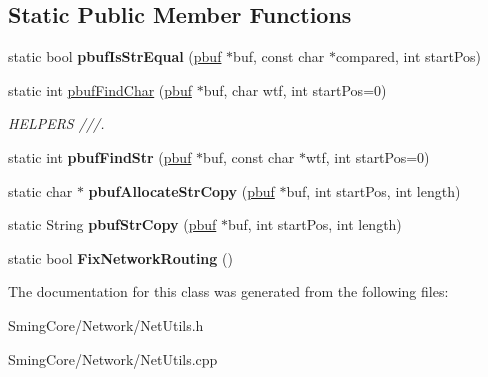 \subsection*{Static Public Member Functions}
\begin{DoxyCompactItemize}
\item 
\hypertarget{class_net_utils_a8d5f716027c7f9fe588058a5f7382c18}{}static bool {\bfseries pbuf\+Is\+Str\+Equal} (\hyperlink{structpbuf}{pbuf} $\ast$buf, const char $\ast$compared, int start\+Pos)\label{class_net_utils_a8d5f716027c7f9fe588058a5f7382c18}

\item 
\hypertarget{class_net_utils_a0b0353dfd9aeae9b1f16275db7699168}{}static int \hyperlink{class_net_utils_a0b0353dfd9aeae9b1f16275db7699168}{pbuf\+Find\+Char} (\hyperlink{structpbuf}{pbuf} $\ast$buf, char wtf, int start\+Pos=0)\label{class_net_utils_a0b0353dfd9aeae9b1f16275db7699168}

\begin{DoxyCompactList}\small\item\em H\+E\+L\+P\+E\+R\+S ///. \end{DoxyCompactList}\item 
\hypertarget{class_net_utils_a930298645b7773227392c08b6efdac33}{}static int {\bfseries pbuf\+Find\+Str} (\hyperlink{structpbuf}{pbuf} $\ast$buf, const char $\ast$wtf, int start\+Pos=0)\label{class_net_utils_a930298645b7773227392c08b6efdac33}

\item 
\hypertarget{class_net_utils_a13a6f47c10d6bbd35445e60bcc1da8a3}{}static char $\ast$ {\bfseries pbuf\+Allocate\+Str\+Copy} (\hyperlink{structpbuf}{pbuf} $\ast$buf, int start\+Pos, int length)\label{class_net_utils_a13a6f47c10d6bbd35445e60bcc1da8a3}

\item 
\hypertarget{class_net_utils_ae5fe4df4559f7f22e8a0682164c89be2}{}static String {\bfseries pbuf\+Str\+Copy} (\hyperlink{structpbuf}{pbuf} $\ast$buf, int start\+Pos, int length)\label{class_net_utils_ae5fe4df4559f7f22e8a0682164c89be2}

\item 
\hypertarget{class_net_utils_a269142c6b80e72a8a3e7767a1818da58}{}static bool {\bfseries Fix\+Network\+Routing} ()\label{class_net_utils_a269142c6b80e72a8a3e7767a1818da58}

\end{DoxyCompactItemize}


The documentation for this class was generated from the following files\+:\begin{DoxyCompactItemize}
\item 
Sming\+Core/\+Network/Net\+Utils.\+h\item 
Sming\+Core/\+Network/Net\+Utils.\+cpp\end{DoxyCompactItemize}
